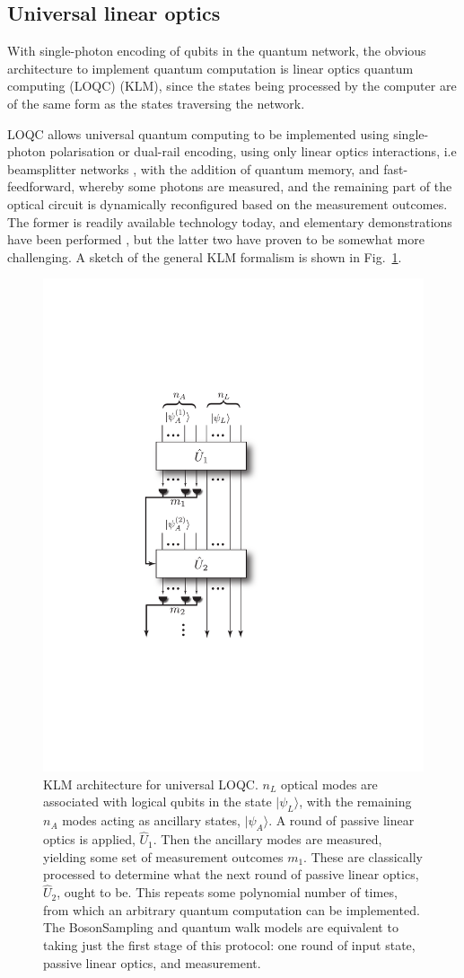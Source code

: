 \documentclass[aps,rmp,twocolumn,amsmath,amssymb,nofootinbib,superscriptaddress,longbibliography,floatfix]{revtex4-1}
\newcommand{\ket}[1]{|#1\rangle}
\begin{document}
%
%

\subsection{Universal linear optics} \label{sec:KLM_univ}

With single-photon encoding of qubits in the quantum network, the obvious architecture to implement quantum computation is linear optics quantum computing (LOQC) \cite{bib:KLM01, bib:Kok05, bib:KokLovettBook} (KLM), since the states being processed by the computer are of the same form as the states traversing the network.

LOQC allows universal quantum computing to be implemented using single-photon polarisation or dual-rail encoding, using only linear optics interactions, i.e beamsplitter networks \cite{bib:Reck94}, with the addition of quantum memory, and fast-feedforward, whereby some photons are measured, and the remaining part of the optical circuit is dynamically reconfigured based on the measurement outcomes. The former is readily available technology today, and elementary demonstrations have been performed \cite{bib:OBrien03, bib:UniversalLOOBrien}, but the latter two have proven to be somewhat more challenging. A sketch of the general KLM formalism is shown in Fig.~\ref{fig:KLM_protocol}.

\begin{figure}[!htb]
\includegraphics[width=0.5\columnwidth]{KLM}
\caption{KLM architecture for universal LOQC. $n_L$ optical modes are associated with logical qubits in the state $\ket{\psi_L}$, with the remaining $n_A$ modes acting as ancillary states, $\ket{\psi_A}$. A round of passive linear optics is applied, $\hat{U}_1$. Then the ancillary modes are measured, yielding some set of measurement outcomes $m_1$. These are classically processed to determine what the next round of passive linear optics, $\hat{U}_2$, ought to be. This repeats some polynomial number of times, from which an arbitrary quantum computation can be implemented. The {\sc BosonSampling} and quantum walk models are equivalent to taking just the first stage of this protocol: one round of input state, passive linear optics, and measurement.} \label{fig:KLM_protocol}
\end{figure}
\end{document}
